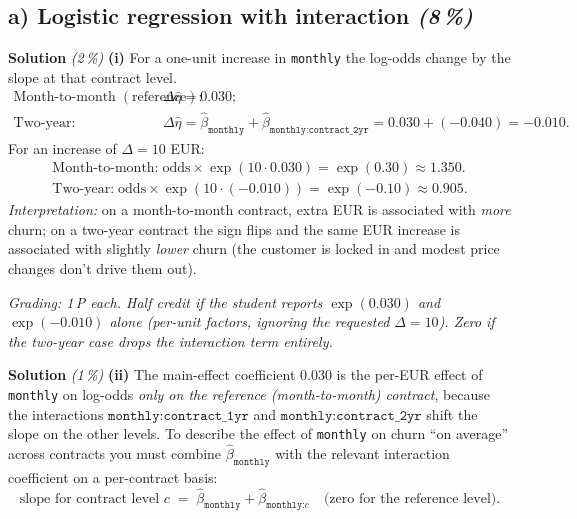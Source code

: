 \documentclass[11pt,a4paper]{article}
\newcommand{\subpoints}[1]{\textit{(#1\,\%)}}
\newcommand{\sol}{\noindent\textbf{Solution}}
\begin{document}
\subsection*{a) Logistic regression with interaction \subpoints{8}}

\sol{} \subpoints{2} \textbf{(i)} For a one-unit increase in \texttt{monthly} the log-odds
change by the slope at that contract level.
\begin{align*}
\text{Month-to-month}\;(\text{reference}):\;& \Delta\hat\eta = 0.030;\\
\text{Two-year}:\;& \Delta\hat\eta = \hat\beta_{\texttt{monthly}} + \hat\beta_{\texttt{monthly:contract\_2yr}}
   = 0.030 + (-0.040) = -0.010.
\end{align*}
For an increase of $\Delta=10$ EUR:
\begin{align*}
\text{Month-to-month:}\;\text{odds}\times \exp(10\cdot 0.030) = \exp(0.30) \approx \boxed{1.350}.\\
\text{Two-year:}\;\text{odds}\times \exp(10\cdot (-0.010)) = \exp(-0.10) \approx \boxed{0.905}.
\end{align*}
\emph{Interpretation:} on a month-to-month contract, extra EUR is associated with \emph{more}
churn; on a two-year contract the sign flips and the same EUR increase is associated with
slightly \emph{lower} churn (the customer is locked in and modest price changes don't drive them
out).

\noindent\emph{Grading: 1\,P each. Half credit if the student reports $\exp(0.030)$ and
$\exp(-0.010)$ alone (per-unit factors, ignoring the requested $\Delta=10$). Zero if the
two-year case drops the interaction term entirely.}

\medskip
\sol{} \subpoints{1} \textbf{(ii)} The main-effect coefficient $0.030$ is the per-EUR effect of
\texttt{monthly} on log-odds \emph{only on the reference (month-to-month) contract}, because the
interactions $\texttt{monthly:contract\_1yr}$ and $\texttt{monthly:contract\_2yr}$ shift the
slope on the other levels. To describe the effect of \texttt{monthly} on churn ``on average''
across contracts you must combine $\hat\beta_{\texttt{monthly}}$ with the relevant interaction
coefficient on a per-contract basis:
$$\text{slope for contract level } c \;=\; \hat\beta_{\texttt{monthly}} + \hat\beta_{\texttt{monthly:}c}\quad\text{(zero for the reference level).}$$
\end{document}
